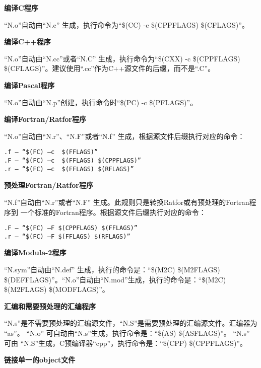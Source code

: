 \begin{dinglist}{47}
\itemsep=4pt

\item \textbf{编译C程序}

“N.o”自动由“N.c” 生成，执行命令为“\$(CC) -c \$(CPPFLAGS) \$(CFLAGS)”。

\item \textbf{编译C++程序}

“N.o”自动由“N.cc”或者“N.C” 生成，执行命令为“\$(CXX) -c \$(CPPFLAGS)
\$(CFLAGS)”。建议使用“.cc”作为C++源文件的后缀，而不是“.C”。

\item \textbf{编译Pascal程序}

“N.o”自动由“N.p”创建，执行命令时“\$(PC) -c \$(PFLAGS)”。

\item \textbf{编译Fortran/Ratfor程序}

“N.o”自动由“N.r”、“N.F”或者“N.f” 生成，根据源文件后缀执行对应的命令：

\begin{Verbatim}[]
.f — “$(FC) –c  $(FFLAGS)”
.F — “$(FC) –c  $(FFLAGS) $(CPPFLAGS)”
.r — “$(FC) –c  $(FFLAGS) $(RFLAGS)”
\end{Verbatim}

\item \textbf{预处理Fortran/Ratfor程序}

“N.f”自动由“N.r”或者“N.F” 生成。此规则只是转换Ratfor或有预处理的Fortran程序到
一个标准的Fortran程序。根据源文件后缀执行对应的命令：

\begin{Verbatim}[]
.F — “$(FC) –F $(CPPFLAGS) $(FFLAGS)”
.r — “$(FC) –F $(FFLAGS) $(RFLAGS)”
\end{Verbatim}

\item \textbf{编译Modula-2程序}

“N.sym”自动由“N.def” 生成，执行的命令是：“\$(M2C) \$(M2FLAGS)
\$(DEFFLAGS)”。“N.o”自动由“N.mod”生成，执行的命令是：“\$(M2C) \$(M2FLAGS)
\$(MODFLAGS)”。

\item \textbf{汇编和需要预处理的汇编程序}

“N.s”是不需要预处理的汇编源文件，“N.S”是需要预处理的汇编源文件。汇编器为
“as”。 “N.o” 可自动由“N.s”生成，执行命令是：“\$(AS) \$(ASFLAGS)”。 “N.s” 可由
“N.S”生成，C预编译器“cpp”，执行命令是：“\$(CPP) \$(CPPFLAGS)”。

\item  \textbf{链接单一的object文件}


\end{dinglist}
